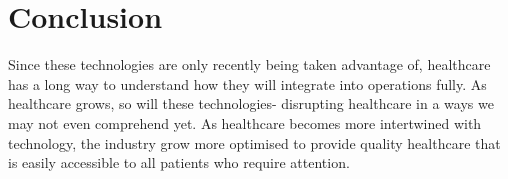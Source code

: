 \documentclass[12pt]{article}
\begin{document}
\section{Conclusion}

Since these technologies are only recently being taken advantage of, healthcare has a long way to understand how they will integrate into operations fully. As healthcare grows, so will these technologies- disrupting healthcare in a ways we may not even comprehend yet. As healthcare becomes more intertwined with technology, the industry grow more optimised to provide quality healthcare that is easily accessible to all patients who require attention.  
\end{document}
